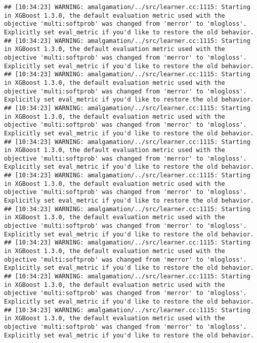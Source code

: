 \documentclass[
]{scrbook}
\begin{document}
\begin{verbatim}
## [10:34:23] WARNING: amalgamation/../src/learner.cc:1115: Starting in XGBoost 1.3.0, the default evaluation metric used with the objective 'multi:softprob' was changed from 'merror' to 'mlogloss'. Explicitly set eval_metric if you'd like to restore the old behavior.
## [10:34:23] WARNING: amalgamation/../src/learner.cc:1115: Starting in XGBoost 1.3.0, the default evaluation metric used with the objective 'multi:softprob' was changed from 'merror' to 'mlogloss'. Explicitly set eval_metric if you'd like to restore the old behavior.
## [10:34:23] WARNING: amalgamation/../src/learner.cc:1115: Starting in XGBoost 1.3.0, the default evaluation metric used with the objective 'multi:softprob' was changed from 'merror' to 'mlogloss'. Explicitly set eval_metric if you'd like to restore the old behavior.
## [10:34:23] WARNING: amalgamation/../src/learner.cc:1115: Starting in XGBoost 1.3.0, the default evaluation metric used with the objective 'multi:softprob' was changed from 'merror' to 'mlogloss'. Explicitly set eval_metric if you'd like to restore the old behavior.
## [10:34:23] WARNING: amalgamation/../src/learner.cc:1115: Starting in XGBoost 1.3.0, the default evaluation metric used with the objective 'multi:softprob' was changed from 'merror' to 'mlogloss'. Explicitly set eval_metric if you'd like to restore the old behavior.
## [10:34:23] WARNING: amalgamation/../src/learner.cc:1115: Starting in XGBoost 1.3.0, the default evaluation metric used with the objective 'multi:softprob' was changed from 'merror' to 'mlogloss'. Explicitly set eval_metric if you'd like to restore the old behavior.
## [10:34:23] WARNING: amalgamation/../src/learner.cc:1115: Starting in XGBoost 1.3.0, the default evaluation metric used with the objective 'multi:softprob' was changed from 'merror' to 'mlogloss'. Explicitly set eval_metric if you'd like to restore the old behavior.
## [10:34:23] WARNING: amalgamation/../src/learner.cc:1115: Starting in XGBoost 1.3.0, the default evaluation metric used with the objective 'multi:softprob' was changed from 'merror' to 'mlogloss'. Explicitly set eval_metric if you'd like to restore the old behavior.
## [10:34:23] WARNING: amalgamation/../src/learner.cc:1115: Starting in XGBoost 1.3.0, the default evaluation metric used with the objective 'multi:softprob' was changed from 'merror' to 'mlogloss'. Explicitly set eval_metric if you'd like to restore the old behavior.
## [10:34:23] WARNING: amalgamation/../src/learner.cc:1115: Starting in XGBoost 1.3.0, the default evaluation metric used with the objective 'multi:softprob' was changed from 'merror' to 'mlogloss'. Explicitly set eval_metric if you'd like to restore the old behavior.

\end{verbatim}
\end{document}
